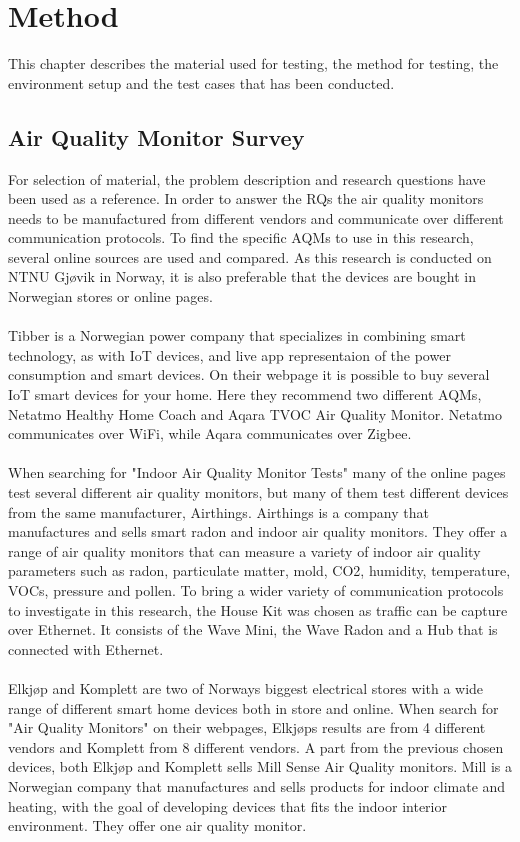 \chapter*{Method}
This chapter describes the material used for testing, the method for testing, the environment setup and the test cases that has been conducted. 
\section*{Air Quality Monitor Survey}
For selection of material, the problem description and research questions have been used as a reference. In order to answer the RQs the air quality monitors needs to be manufactured from different vendors and communicate over different communication protocols. To find the specific AQMs to use in this research, several online sources are used and compared. As this research is conducted on NTNU Gjøvik in Norway, it is also preferable that the devices are bought in Norwegian stores or online pages.
\\\\
Tibber \cite{Tibber} is a Norwegian power company that specializes in combining smart technology, as with IoT devices, and live app representaion of the power consumption and smart devices. \cite{Tibber} On their webpage it is possible to buy several IoT smart devices for your home. Here they recommend two different AQMs, Netatmo Healthy Home Coach and Aqara TVOC Air Quality Monitor. Netatmo communicates over WiFi, while Aqara communicates over Zigbee. 
\\\\
When searching for "Indoor Air Quality Monitor Tests" many of the online pages test several different air quality monitors, but many of them test different devices from the same manufacturer, Airthings. \cite{AQMTest1} \cite{AQMTest2} \cite{AQMTest3} Airthings \cite{Airthings} is a company that manufactures and sells smart radon and indoor air quality monitors. They offer a range of air quality monitors that can measure a variety of indoor air quality parameters such as radon, particulate matter, mold, CO2, humidity, temperature, VOCs, pressure and pollen. \cite{AirthingsProducts} To bring a wider variety of communication protocols to investigate in this research, the House Kit was chosen as traffic can be capture over Ethernet. It consists of the Wave Mini, the Wave Radon and a Hub that is connected with Ethernet. \cite{AirthingsProducts}
\\\\
Elkjøp \cite{Elkjøp} and Komplett \cite{Komplett} are two of Norways biggest electrical stores with a wide range of different smart home devices both in store and online. When search for "Air Quality Monitors" on their webpages, Elkjøps results are from 4 different vendors and Komplett from 8 different vendors. A part from the previous chosen devices, both Elkjøp and Komplett sells Mill Sense Air Quality monitors. Mill \cite{Mill} is a Norwegian company that manufactures and sells products for indoor climate and heating, with the goal of developing devices that fits the indoor interior environment. They offer one air quality monitor. 
\\\\
